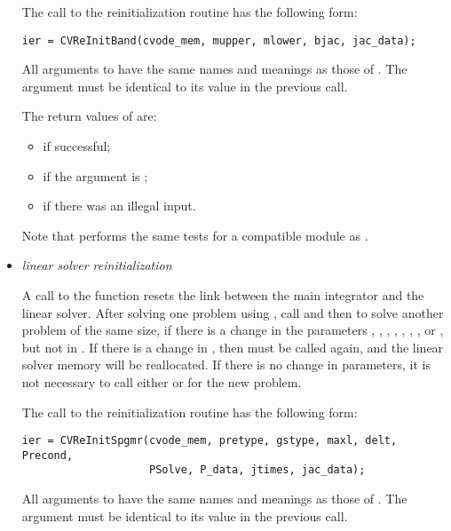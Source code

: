 \begin{itemize}
  The call to the {\cvband} reinitialization routine has the following form:
\begin{verbatim}
ier = CVReInitBand(cvode_mem, mupper, mlower, bjac, jac_data);
\end{verbatim}
  All arguments to  have the same names and meanings
  as those of .  The  argument must be identical 
  to its value in the previous  call.                     
  
  The return values of  are:
  \begin{itemize}
  \item {} if successful;
  \item {} if the  argument is ;
  \item {} if there was an illegal input.
  \end{itemize}         
  
  Note that  performs the same tests for a compatible {\nvector} 
  module as .  

\item {\em {\spgmr} linear solver reinitialization}
  
  A call to the  function resets the link between   
  the main {\cvodes} integrator and the {\cvspgmr} linear solver.       
  After solving one problem using {\cvspgmr}, call  and then
   to solve another problem of the same size, if    
  there is a change in the  parameters , ,   
  , , , , , or 
  , but not in .  
  If there is a change in , then  must be      
  called again, and the linear solver memory will be reallocated.
  If there is no change in parameters, it is not necessary to    
  call either  or  for the new problem.

  The call to the {\cvspgmr} reinitialization routine has the following form:
\begin{verbatim}
ier = CVReInitSpgmr(cvode_mem, pretype, gstype, maxl, delt, Precond, 
                    PSolve, P_data, jtimes, jac_data);
\end{verbatim}
  All arguments to  have the same names and meanings
  as those of .  The  argument must be identical 
  to its value in the previous  call.                     
  

\end{itemize}
